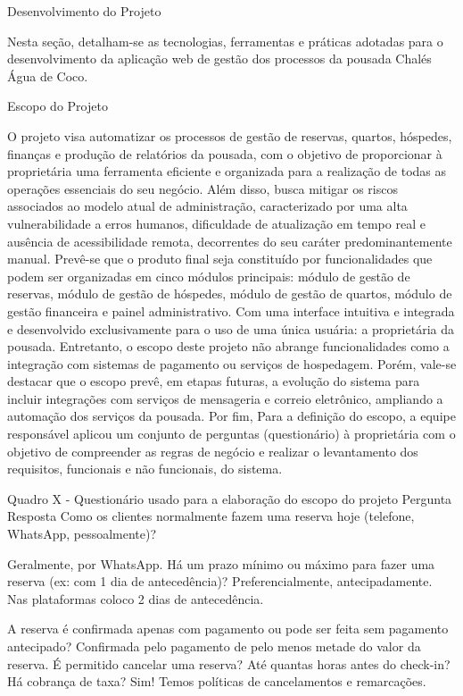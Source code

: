 Desenvolvimento do Projeto


Nesta seção, detalham-se as tecnologias, ferramentas e práticas adotadas para o desenvolvimento da aplicação web de gestão dos processos da pousada Chalés Água de Coco.


Escopo do Projeto 


O projeto visa automatizar os processos de gestão de reservas, quartos, hóspedes, finanças e produção de relatórios da pousada, com o objetivo de proporcionar à proprietária uma ferramenta eficiente e organizada para a realização de todas as operações essenciais do seu negócio. Além disso, busca mitigar os riscos associados ao modelo atual de administração, caracterizado por uma alta vulnerabilidade a erros humanos, dificuldade de atualização em tempo real e ausência de acessibilidade remota, decorrentes do seu caráter predominantemente manual.
Prevê-se que o produto final seja constituído por funcionalidades que podem ser organizadas em cinco módulos principais: módulo de gestão de reservas, módulo de gestão de hóspedes, módulo de gestão de quartos, módulo de gestão financeira e painel administrativo. Com uma interface intuitiva e integrada e desenvolvido exclusivamente para o uso de uma única usuária: a proprietária da pousada.
Entretanto, o escopo deste projeto não abrange funcionalidades como a integração com sistemas de pagamento ou serviços de hospedagem. Porém, vale-se destacar que o escopo prevê, em etapas futuras, a evolução do sistema para incluir integrações com serviços de mensageria e correio eletrônico, ampliando a automação dos serviços da pousada.
Por fim, Para a definição do escopo, a equipe responsável aplicou um conjunto de perguntas (questionário) à proprietária com o objetivo de compreender as regras de negócio e realizar o levantamento dos requisitos, funcionais e não funcionais, do sistema. 


Quadro X - Questionário usado para a elaboração do escopo do projeto 
Pergunta
Resposta
Como os clientes normalmente fazem uma reserva hoje (telefone, WhatsApp, pessoalmente)?


Geralmente, por WhatsApp.
Há um prazo mínimo ou máximo para fazer uma reserva (ex: com 1 dia de antecedência)?
Preferencialmente, antecipadamente. Nas plataformas coloco 2 dias de antecedência.


A reserva é confirmada apenas com pagamento ou pode ser feita sem pagamento antecipado?
Confirmada pelo pagamento de pelo menos metade do valor da reserva.
É permitido cancelar uma reserva? Até quantas horas antes do check-in? Há cobrança de taxa?
Sim!  Temos políticas de cancelamentos e remarcações.


